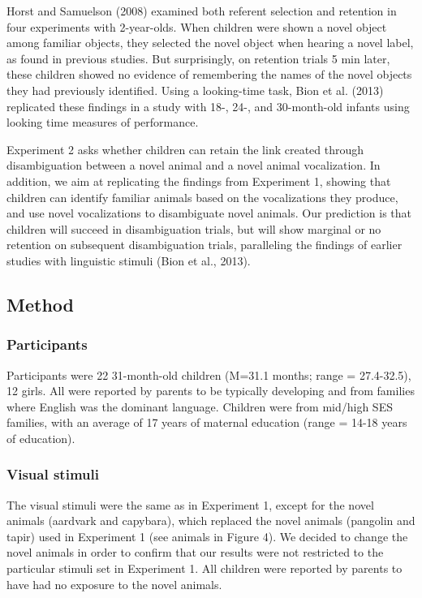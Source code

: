 \documentclass[english,floatsintext,man]{apa6}
\theoremstyle{definition}
\theoremstyle{definition}
\theoremstyle{definition}
\theoremstyle{remark}
\begin{document}
Horst and Samuelson (2008) examined both referent selection and
retention in four experiments with 2-year-olds. When children were shown
a novel object among familiar objects, they selected the novel object
when hearing a novel label, as found in previous studies. But
surprisingly, on retention trials 5 min later, these children showed no
evidence of remembering the names of the novel objects they had
previously identified. Using a looking-time task, Bion et al. (2013)
replicated these findings in a study with 18-, 24-, and 30-month-old
infants using looking time measures of performance.

Experiment 2 asks whether children can retain the link created through
disambiguation between a novel animal and a novel animal vocalization.
In addition, we aim at replicating the findings from Experiment 1,
showing that children can identify familiar animals based on the
vocalizations they produce, and use novel vocalizations to disambiguate
novel animals. Our prediction is that children will succeed in
disambiguation trials, but will show marginal or no retention on
subsequent disambiguation trials, paralleling the findings of earlier
studies with linguistic stimuli (Bion et al., 2013).

\subsection{Method}\label{method-1}

\subsubsection{Participants}\label{participants-1}

Participants were 22 31-month-old children (M=31.1 months; range =
27.4-32.5), 12 girls. All were reported by parents to be typically
developing and from families where English was the dominant language.
Children were from mid/high SES families, with an average of 17 years of
maternal education (range = 14-18 years of education).

\subsubsection{Visual stimuli}\label{visual-stimuli-1}

The visual stimuli were the same as in Experiment 1, except for the
novel animals (aardvark and capybara), which replaced the novel animals
(pangolin and tapir) used in Experiment 1 (see animals in Figure 4). We
decided to change the novel animals in order to confirm that our results
were not restricted to the particular stimuli set in Experiment 1. All
children were reported by parents to have had no exposure to the novel
animals.
\end{document}
